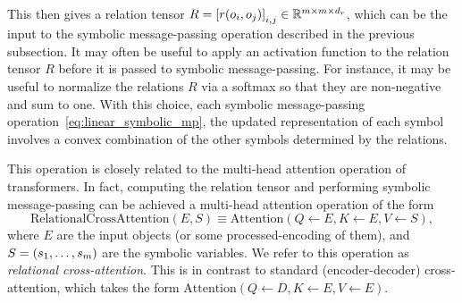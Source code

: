 This then gives a relation tensor $R = \left[r(o_i, o_j)\right]_{i,j} \in \mathbb{R}^{m \times m \times d_r}$, which can be the input to the symbolic message-passing operation described in the previous subsection. It may often be useful to apply an activation function to the relation tensor $R$ before it is passed to symbolic message-passing. For instance, it may be useful to normalize the relations $R$ via a softmax so that they are non-negative and sum to one. With this choice, each symbolic message-passing operation~\cref{eq:linear_symbolic_mp}, the updated representation of each symbol involves a convex combination of the other symbols determined by the relations.

This operation is closely related to the multi-head attention operation of transformers. In fact, computing the relation tensor and performing symbolic message-passing can be achieved a multi-head attention operation of the form
\begin{equation}\label{eq:relation_crossattention}
    \text{RelationalCrossAttention}\left(E, S\right) \equiv \text{Attention}\left( Q \gets E, K \gets E, V \gets S \right),
\end{equation}
where $E$ are the input objects (or some processed-encoding of them), and $S = (s_1, \ldots, s_m)$ are the symbolic variables. We refer to this operation as \textit{relational cross-attention}. This is in contrast to standard (encoder-decoder) cross-attention, which takes the form $\text{Attention}\left( Q \gets D, K \gets E, V \gets E \right)$.




